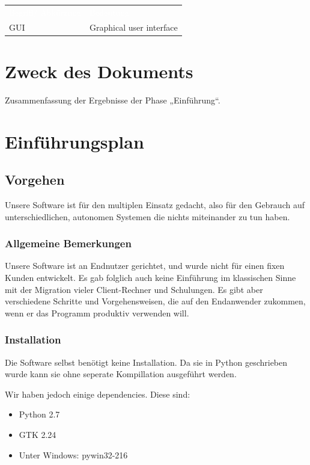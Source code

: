 \documentclass[10pt,paper=a4,final]{scrartcl}
\begin{document}
\begin{tabularx}{\textwidth}{l X}
\textcolor{white}{Begriff/ Abkürzung}\cellcolor{blue!80!} & \textcolor{white}{Bedeutung}\cellcolor{blue!80!} \\
GUI \cellcolor{blue!20!} & Graphical user interface \cellcolor{blue!20!} \\
\end{tabularx}
\newline
\newline
\newline

{}
\flushleft
\newpage
\tableofcontents
\newpage
\section{Zweck des Dokuments}
Zusammenfassung der Ergebnisse der Phase „Einführung“.
\section{Einf\"uhrungsplan}
\subsection{Vorgehen}
Unsere Software ist für den multiplen Einsatz gedacht, also für den Gebrauch auf unterschiedlichen, autonomen Systemen die nichts miteinander zu tun haben.
\subsubsection{Allgemeine Bemerkungen}
Unsere Software ist an Endnutzer gerichtet, und wurde nicht für einen fixen Kunden entwickelt. Es gab folglich auch keine Einführung im klassischen Sinne mit der Migration vieler Client-Rechner und Schulungen.
Es gibt aber verschiedene Schritte und Vorgehensweisen, die auf den Endanwender zukommen, wenn er das Programm produktiv verwenden will.
\subsubsection{Installation}
Die Software selbst benötigt keine Installation. Da sie in Python geschrieben wurde kann sie ohne seperate Kompillation ausgeführt werden.

Wir haben jedoch einige dependencies. Diese sind:
\begin{itemize}
  \item Python 2.7
  \item GTK 2.24
  \item Unter Windows: pywin32-216
\end{itemize}
\end{document}
